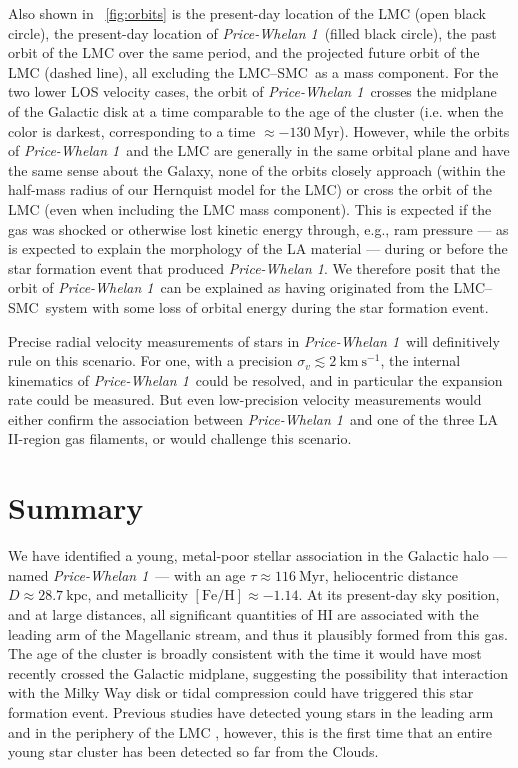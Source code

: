 \documentclass[twocolumn]{aastex62}
\newcommand{\kms}{\ensuremath{\textrm{km}~\textrm{s}^{-1}}}
\newcommand{\feh}{\ensuremath{[\textrm{Fe} / \textrm{H}]}}
\newcommand{\hi}{H{\footnotesize I} }
\newcommand{\clustername}{\textsl{Price-Whelan 1}}
\newcommand{\lmcsmc}{LMC--SMC}
\newcommand{\clage}{\ensuremath{116~\textrm{Myr}}}
\newcommand{\clfeh}{\ensuremath{-1.14}}
\newcommand{\cldist}{\ensuremath{28.7~\textrm{kpc}}}
\begin{document}
Also shown in \figurename~\ref{fig:orbits} is the present-day location of the LMC (open black circle), the present-day location of \clustername\ (filled black circle), the past orbit of the LMC over the same period, and the projected future orbit of the LMC (dashed line), all excluding the \lmcsmc\ as a mass component.
For the two lower LOS velocity cases, the orbit of \clustername\ crosses the midplane of the Galactic disk at a time comparable to the age of the cluster (i.e. when the color is darkest, corresponding to a time $\approx -130~\textrm{Myr}$).
However, while the orbits of \clustername\ and the LMC are generally in the same orbital plane and have the same sense about the Galaxy, none of the orbits closely approach (within the half-mass radius of our Hernquist model for the LMC) or cross the orbit of the LMC (even when including the LMC mass component).
This is expected if the gas was shocked or otherwise lost kinetic energy through, e.g., ram pressure --- as is expected to explain the morphology of the LA material \citep[e.g.,][]{Hammer:2015} --- during or before the star formation event that produced \clustername.
We therefore posit that the orbit of \clustername\ can be explained as having originated from the \lmcsmc\ system with some loss of orbital energy during the star formation event.

Precise radial velocity measurements of stars in \clustername\ will definitively rule on this scenario.
For one, with a precision $\sigma_v \lesssim 2~\kms$, the internal kinematics of \clustername\ could be resolved, and in particular the expansion rate could be measured.
But even low-precision velocity measurements would either confirm the association between \clustername\ and one of the three LA II-region gas filaments, or would challenge this scenario.


\section{Summary} \label{sec:conclusion}

We have identified a young, metal-poor stellar association in the Galactic halo --- named \clustername\ --- with an age $\tau \approx \clage$, heliocentric distance $D \approx \cldist$, and metallicity $\feh \approx \clfeh$.
At its present-day sky position, and at large distances, all significant quantities of \hi are associated with the leading arm of the Magellanic stream, and thus it plausibly formed from this gas.
The age of the cluster is broadly consistent with the time it would have most recently crossed the Galactic midplane, suggesting the possibility that interaction with the Milky Way disk or tidal compression could have triggered this star formation event.
Previous studies have detected young stars in the leading arm and in the periphery of the LMC \citep{Casetti-Dinescu:2014, Moni-Bidin:2017}, however, this is the first time that an entire young star cluster has been detected so far from the Clouds.
\end{document}
